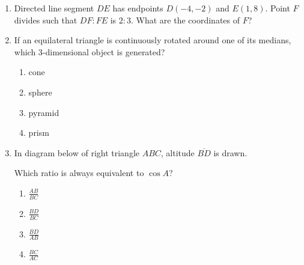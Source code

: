 \documentclass[12pt, oneside]{article}
\begin{document}
\begin{enumerate}[itemsep=1.2cm]
\item Directed line segment $DE$ has endpoints $D(-4, -2)$ and $E(1,8)$.
Point $F$ divides such that $DF:FE$ is $2:3$. What are the coordinates
of $F$?

\item If an equilateral triangle is continuously rotated around one of its medians, which 3-dimensional object is generated?
    \begin{enumerate}
      \item cone
      \item sphere
      \item pyramid
      \item prism
    \end{enumerate}

\item In diagram below of right triangle $ABC$, altitude $\overline{BD}$ is drawn.
  \begin{center}
  \end{center}
    Which ratio is always equivalent to $\cos A$?
    \begin{multicols}{2}
    \begin{enumerate}
        \item $\displaystyle \frac{AB}{BC}$
        \item $\displaystyle \frac{BD}{BC}$ 
        \item $\displaystyle \frac{BD}{AB}$
        \item $\displaystyle \frac{BC}{AC}$
    \end{enumerate}
    \end{multicols}

\end{enumerate}
\end{document}
